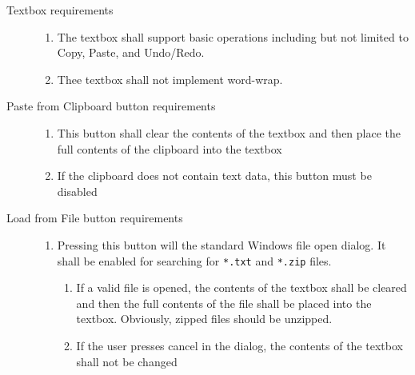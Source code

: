 \begin{description}
\item[Textbox requirements] \hfill
\begin{enumerate}
\item The textbox shall support basic operations including but not limited to
Copy, Paste, and Undo/Redo.
\item Thee textbox shall not implement word-wrap.	  
\end{enumerate}

\item[Paste from Clipboard button requirements] \hfill
\begin{enumerate}
\item This button shall clear the contents of the textbox and then place
the full contents of the clipboard into the textbox
\item If the clipboard does not contain text data, this button must be
disabled
\end{enumerate}

\item[Load from File button requirements] \hfill
\begin{enumerate}
\item Pressing this button will the standard Windows file open dialog.  It
shall be enabled for searching for \texttt{*.txt} and \texttt{*.zip} files.
\begin{enumerate}
\item  If a valid file is opened, the contents of the textbox shall be cleared
and then the full contents of the file shall be placed into the textbox.
Obviously, zipped files should be unzipped.
\item If the user presses cancel in the dialog, the contents of the textbox
shall not be changed
\end{enumerate}
\end{enumerate}


\end{description}
